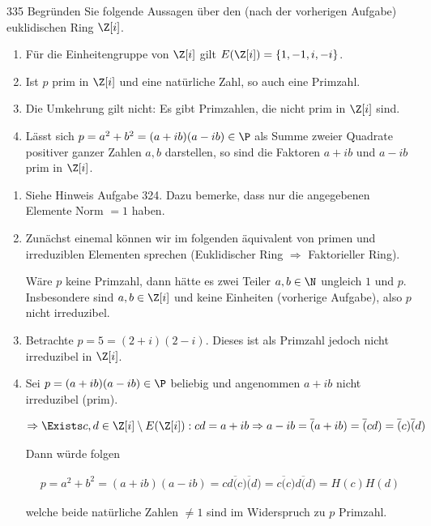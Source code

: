 \begin{algebraUE}{335}
Begründen Sie folgende Aussagen über den (nach der vorherigen Aufgabe) euklidischen Ring $\Z [i]$.

\begin{enumerate}
  \item Für die Einheitengruppe von $\Z [i]$ gilt $E(\Z [i]) = \{1,-1,i,-i\}$.

  \item Ist $p$ prim in $\Z [i]$ und eine natürliche Zahl, so auch eine Primzahl.

  \item Die Umkehrung gilt nicht: Es gibt Primzahlen, die nicht prim in $\Z [i]$ sind.

  \item Lässt sich $p = a^2 + b^2 = (a+ib)(a-ib) \in \P$ als Summe zweier Quadrate positiver ganzer Zahlen $a,b$ darstellen, so sind die Faktoren $a+ib$ und $a-ib$ prim in $\Z [i]$.

\end{enumerate}

\end{algebraUE}

\begin{solution}
\begin{enumerate}
  \item Siehe Hinweis Aufgabe 324. Dazu bemerke, dass nur die angegebenen Elemente Norm $= 1$ haben.

  \item Zunächst einemal können wir im folgenden äquivalent von primen und irreduziblen Elementen sprechen (Euklidischer Ring $\Rightarrow$ Faktorieller Ring).

  Wäre $p$ keine Primzahl, dann hätte es zwei Teiler $a,b \in \N$ ungleich $1$ und $p$. Insbesondere sind $a,b \in \Z [i]$ und keine Einheiten (vorherige Aufgabe), also $p$ nicht irreduzibel.

  \item Betrachte $p = 5 = (2+i)(2-i)$. Dieses ist als Primzahl jedoch nicht irreduzibel in $\Z [i]$.

  \item Sei $p = (a+ib)(a-ib) \in \P$ beliebig und angenommen $a+ib$ nicht irreduzibel (prim).

  \begin{align*}
    \Rightarrow \Exists c,d \in \Z [i] \setminus E(\Z [i]):  cd = a+ib \Rightarrow a - ib = \overline(a+ib) = \overline(cd) = \overline(c) \overline(d)
  \end{align*}

  Dann würde folgen

  \begin{align*}
    p = a^2 + b^2 = (a+ib)(a-ib) = cd\overline(c) \overline(d) = c\overline(c)d \overline(d) = H(c)H(d)
  \end{align*}

  welche beide natürliche Zahlen $\neq 1$ sind im Widerspruch zu $p$ Primzahl.


\end{enumerate}

\end{solution}
